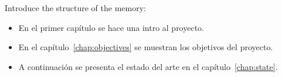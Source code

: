 Introduce the structure of the memory:

\begin{itemize}
  \item En el primer capítulo se hace una intro al proyecto.
  
  \item En el capítulo~\ref{chap:objectives} se muestran los objetivos del proyecto.
  
  \item A continuación se presenta el estado del arte en el capítulo~\ref{chap:state}.
  
\end{itemize}

